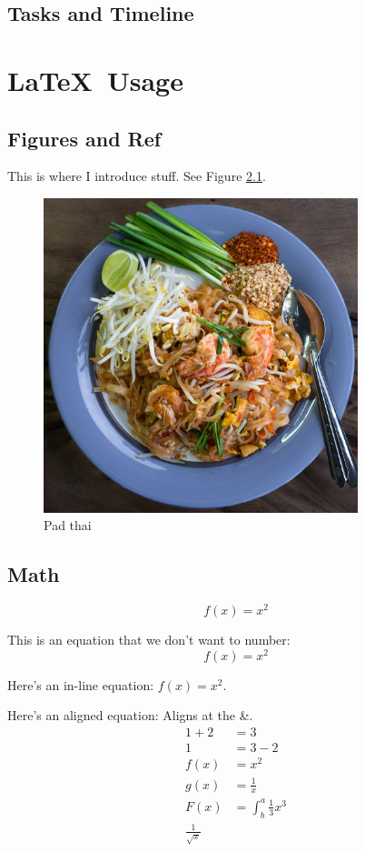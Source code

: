 \documentclass[12pt,letterpaper,titlepage]{report}
\begin{document}
\section{Tasks and Timeline}



\chapter{\LaTeX\ Usage}

\section{Figures and Ref}
This is where I introduce stuff. See Figure \ref{fig:padthai}.

\begin{figure}[H]   %
	\centering
	\includegraphics[width=3.6in]{images/padthai.jpg}
	\caption{Pad thai}
	\label{fig:padthai}
\end{figure}



\section{Math}

\begin{equation}
	f(x) = x^2
\end{equation}


This is an equation that we don't want to number: $$f(x) = x^2$$

Here's an in-line equation: $f(x) = x^2$.

Here's an aligned equation: Aligns at the \&.
\begin{align*}
	1 + 2 & = 3                       \\
	1     & = 3 - 2                   \\
	f(x)  & = x^2                     \\
	g(x)  & = \frac{1}{x}             \\
	F(x)  & = \int^a_b \frac{1}{3}x^3 \\
	\frac{1}{\sqrt{x}}
\end{align*}
\end{document}
